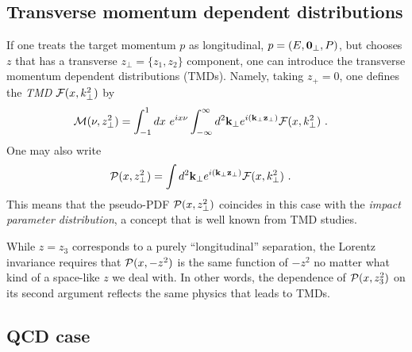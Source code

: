 \documentclass[final,5p,times,twocolumn]{elsarticle}
\begin{document}
 \subsection{Transverse momentum dependent
distributions}   

If one treats 
the target momentum $p$ as   longitudinal,
\mbox{$p= (E, {\bf 0}_\perp, P)$,}   but 
chooses  $z$ that has a transverse 
 $z_\perp= \{z_1,z_2\}$ component, one can  
  introduce  the transverse momentum dependent distributions (TMDs). 
Namely, 
 taking $z_+=0$,    one defines  the  
{\it TMD }   ${\cal F} (x, k_\perp^2)$ by 
     \begin{align}
 {\cal M} (\nu,  z_\perp^2) 
&   = 
 \int_{-1}^1 dx \,\, e^{i x  \nu  }  
    \int_{-\infty}^\infty  d^2{\bf k}_\perp   e^{i ({\bf k}_\perp {\bf z}_\perp)} 
      {\cal F} (x, k_\perp^2)
 \   .
  \label{MTMD}
\end{align}   
 One  may also write 
    \begin{align}
 {\cal P} (x,  z_\perp^2) 
&   = 
    \int  d^2{\bf k}_\perp   e^{i ({\bf k}_\perp {\bf z}_\perp)} 
      {\cal F} (x, {k}_\perp^2)
 \   .
  \label{MTMD0}
\end{align}  
This means that 
 the pseudo-PDF   $ {\cal P} (x,  z_\perp^2) $ coincides
 in this case 
with the  {\it impact parameter distribution}, a   concept 
that is well known  
from TMD studies.

While $z=z_3$ corresponds to  a purely ``longitudinal'' 
separation, the Lorentz invariance  
requires that ${\cal P} (x,- z^2) $  is the same function 
of $-z^2$ no matter what kind of a space-like $z$ we deal with.
In other words, 
 the dependence of  ${\cal P} (x, z_3^2) $  
on its second argument reflects the same physics 
that leads to TMDs.  



 \subsection{QCD case}  
 
\end{document}
